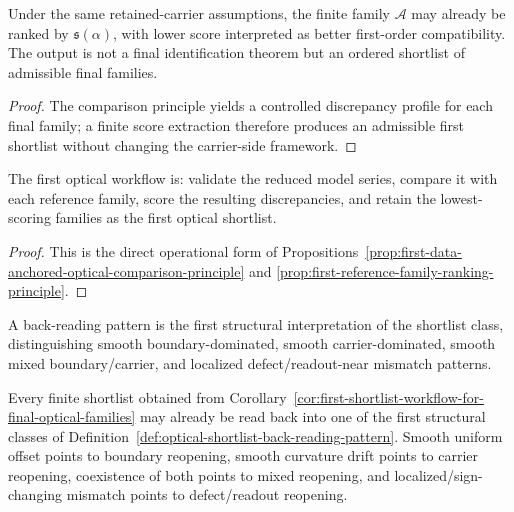 \begin{proposition}
\label{prop:first-reference-family-ranking-principle}
Under the same retained-carrier assumptions, the finite family $\mathcal A$ may already be ranked by $\mathfrak s(\alpha)$, with lower score interpreted as better first-order compatibility. The output is not a final identification theorem but an ordered shortlist of admissible final families.
\end{proposition}

\begin{proof}
The comparison principle yields a controlled discrepancy profile for each final family; a finite score extraction therefore produces an admissible first shortlist without changing the carrier-side framework.
\end{proof}

\begin{corollary}
\label{cor:first-shortlist-workflow-for-final-optical-families}
The first optical workflow is: validate the reduced model series, compare it with each reference family, score the resulting discrepancies, and retain the lowest-scoring families as the first optical shortlist.
\end{corollary}

\begin{proof}
This is the direct operational form of Propositions~\ref{prop:first-data-anchored-optical-comparison-principle} and \ref{prop:first-reference-family-ranking-principle}.
\end{proof}

\begin{definition}
\label{def:optical-shortlist-back-reading-pattern}
A back-reading pattern is the first structural interpretation of the shortlist class, distinguishing smooth boundary-dominated, smooth carrier-dominated, smooth mixed boundary/carrier, and localized defect/readout-near mismatch patterns.
\end{definition}

\begin{proposition}
\label{prop:first-structural-back-reading-principle-from-optical-shortlists}
Every finite shortlist obtained from Corollary~\ref{cor:first-shortlist-workflow-for-final-optical-families} may already be read back into one of the first structural classes of Definition~\ref{def:optical-shortlist-back-reading-pattern}. Smooth uniform offset points to boundary reopening, smooth curvature drift points to carrier reopening, coexistence of both points to mixed reopening, and localized/sign-changing mismatch points to defect/readout reopening.
\end{proposition}

